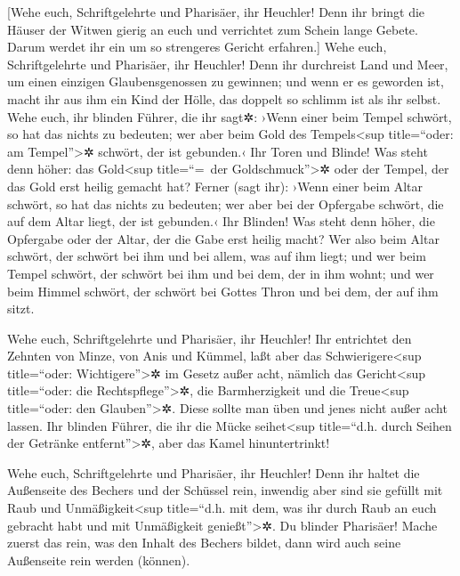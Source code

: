  {[}Wehe euch, Schriftgelehrte und Pharisäer, ihr
Heuchler! Denn ihr bringt die Häuser der Witwen gierig an euch und
verrichtet zum Schein lange Gebete. Darum werdet ihr ein um so
strengeres Gericht erfahren.{]}  Wehe euch,
Schriftgelehrte und Pharisäer, ihr Heuchler! Denn ihr durchreist Land
und Meer, um einen einzigen Glaubensgenossen zu gewinnen; und wenn er es
geworden ist, macht ihr aus ihm ein Kind der Hölle, das doppelt so
schlimm ist als ihr selbst.  Wehe euch, ihr blinden
Führer, die ihr sagt✲: ›Wenn einer beim Tempel schwört, so hat das
nichts zu bedeuten; wer aber beim Gold des Tempels\textless sup
title=``oder: am Tempel''\textgreater✲ schwört, der ist gebunden.‹
 Ihr Toren und Blinde! Was steht denn höher: das
Gold\textless sup title=``=~der Goldschmuck''\textgreater✲ oder der
Tempel, der das Gold erst heilig gemacht hat?  Ferner
(sagt ihr): ›Wenn einer beim Altar schwört, so hat das nichts zu
bedeuten; wer aber bei der Opfergabe schwört, die auf dem Altar liegt,
der ist gebunden.‹  Ihr Blinden! Was steht denn höher,
die Opfergabe oder der Altar, der die Gabe erst heilig macht?
 Wer also beim Altar schwört, der schwört bei ihm und bei
allem, was auf ihm liegt;  und wer beim Tempel schwört,
der schwört bei ihm und bei dem, der in ihm wohnt;  und
wer beim Himmel schwört, der schwört bei Gottes Thron und bei dem, der
auf ihm sitzt.

 Wehe euch, Schriftgelehrte und Pharisäer, ihr Heuchler!
Ihr entrichtet den Zehnten von Minze, von Anis und Kümmel, laßt aber das
Schwierigere\textless sup title=``oder: Wichtigere''\textgreater✲ im
Gesetz außer acht, nämlich das Gericht\textless sup title=``oder: die
Rechtspflege''\textgreater✲, die Barmherzigkeit und die
Treue\textless sup title=``oder: den Glauben''\textgreater✲. Diese
sollte man üben und jenes nicht außer acht lassen.  Ihr
blinden Führer, die ihr die Mücke seihet\textless sup title=``d.h. durch
Seihen der Getränke entfernt''\textgreater✲, aber das Kamel
hinuntertrinkt!

 Wehe euch, Schriftgelehrte und Pharisäer, ihr Heuchler!
Denn ihr haltet die Außenseite des Bechers und der Schüssel rein,
inwendig aber sind sie gefüllt mit Raub und Unmäßigkeit\textless sup
title=``d.h. mit dem, was ihr durch Raub an euch gebracht habt und mit
Unmäßigkeit genießt''\textgreater✲.  Du blinder
Pharisäer! Mache zuerst das rein, was den Inhalt des Bechers bildet,
dann wird auch seine Außenseite rein werden (können).

